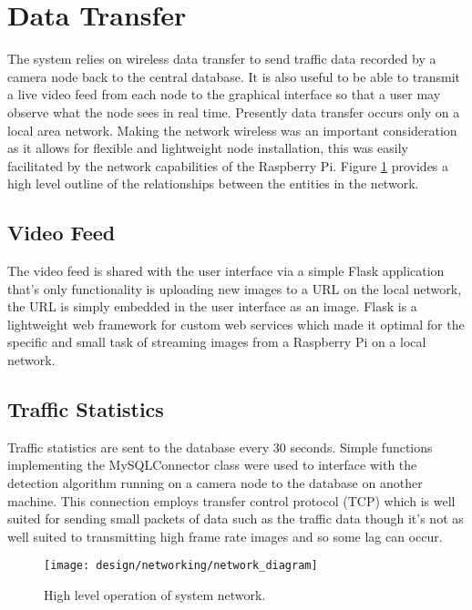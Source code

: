 \section{Data Transfer}

The system relies on wireless data transfer to send traffic data recorded by a camera node back to the central database. It is also useful to be able to transmit a live video feed from each node to the graphical interface so that a user may observe what the node sees in real time. Presently data transfer occurs only on a local area network. Making the network wireless was an important consideration as it allows for flexible and lightweight node installation, this was easily facilitated by the network capabilities of the Raspberry Pi. Figure \ref{fig:network_diagram} provides a high level outline of the relationships between the entities in the network.

\subsection{Video Feed}

The video feed is shared with the user interface via a simple Flask \cite{flask} application that's only functionality is uploading new images to a URL on the local network, the URL is simply embedded in the user interface as an image. Flask is a lightweight web framework for custom web services which made it optimal for the specific and small task of streaming images from a Raspberry Pi on a local network.


\subsection{Traffic Statistics}

Traffic statistics are sent to the database every 30 seconds. Simple functions implementing the MySQLConnector class \cite{mysqlconnector}\cite{mysqltutorial} were used to interface with the detection algorithm running on a camera node to the database on another machine. This connection employs transfer control protocol (TCP) which is well suited for sending small packets of data such as the traffic data though it's not as well suited to transmitting high frame rate images and so some lag can occur. 

\begin{figure}[H]
    \centering
    \centering\texttt{[image: design/networking/network\_diagram]}
    \caption{High level operation of system network.}
    \label{fig:network_diagram}
\end{figure}